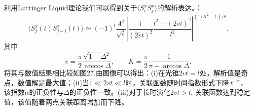 \documentclass[12pt]{article}
\begin{document}
      利用Luttinger Liquid理论我们可以得到关于$\langle S_i^xS_j^x\rangle$的解析表达\cite{collura2015quantum}。：
      \begin{equation}\langle S_j^x(t)S_{j+l}^x(t)\rangle\simeq (-1)^l\frac{A^x}{\sqrt{l}}\left| \frac{1}{{(2\tilde vt)}^2}\frac{l^2-{(2\tilde vt)}^2}{l^2} \right|^{(1/K^2-1)/8}  .\end{equation}
      其中
      \begin{equation}\tilde v=\frac{\pi}{2}\frac{\sqrt{1-\Delta^2}}{\arccos\Delta},\qquad K=\frac{\pi}{2}\frac{1}{\pi-\arccos\Delta}.\end{equation}
      将其与数值结果相比较如图27.由图像可以得出：(i)在光锥$2vt=l$处，解析值是奇点，数值解是最大值；(ii)当$1\ll2vt\ll l$时，关联函数随时间指数形式下降$~t^{-\alpha}$，该指数$\alpha$的正负性与$\Delta$的正负性一致。(iii)对于长时演化$2vt>l$, 关联函数达到稳定值，该值随着两点关联距离增加而下降。
\end{document}

